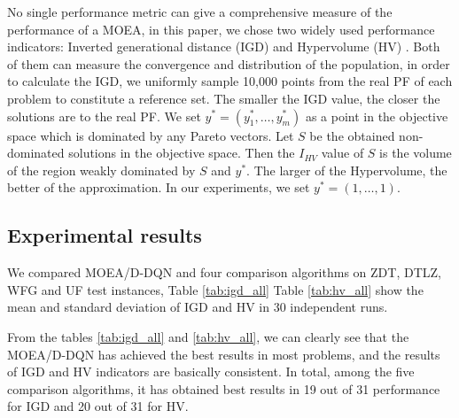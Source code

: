 \documentclass[journal]{IEEEtran}
\begin{document}
No single performance metric can give a comprehensive measure of the performance of a MOEA, in this paper, we chose two widely used performance indicators: Inverted generational distance (IGD) \cite{igd} and Hypervolume (HV) \cite{hv}.
Both of them can measure the convergence and distribution of the population, in order to calculate the IGD, we uniformly sample 10,000 points from the real PF of each problem to constitute a reference set. The smaller the IGD value, the closer the solutions are to the real PF.
We set $y^* = (y^*_1, \dots, y^*_m)$ as a point in the objective space which is dominated by any Pareto vectors. Let $S$ be the obtained non-dominated solutions in the objective space. Then the $I_{HV}$ value of $S$ is the volume of the region weakly dominated by $S$ and $y^*$. The larger of the Hypervolume, the better of the approximation. In our experiments, we set $y^* = (1,\dots, 1).$

\subsection{Experimental results}
We compared MOEA/D-DQN and four comparison algorithms on ZDT, DTLZ, WFG and UF test instances, Table \ref{tab:igd_all} Table \ref{tab:hv_all} show the mean and standard deviation of IGD and HV in 30 independent runs.

From the tables \ref{tab:igd_all} and \ref{tab:hv_all}, we can clearly see that the MOEA/D-DQN has achieved the best results in most problems, and the results of IGD and HV indicators are basically consistent. In total, among the five comparison algorithms, it has obtained best results in 19 out of 31 performance for IGD and 20 out of 31 for HV.
\end{document}
